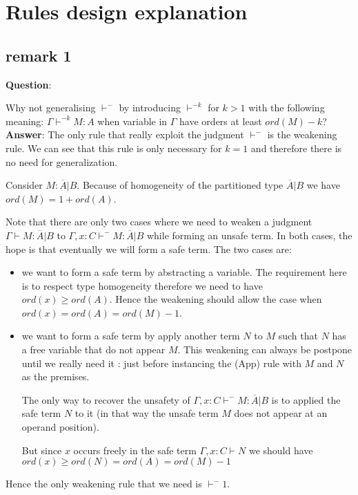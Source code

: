 \documentclass{article}
\begin{document}
\section{Rules design explanation}

\subsection{remark 1}

\textbf{Question}:

Why not generalising $\vdash^-$ by introducing $\vdash^{-k}$ for
$k>1$ with the following meaning: $ \Gamma \vdash^{-k} M : A$ when
variable in $\Gamma$ have orders at least $ord(M)-k$?
\\


\textbf{Answer}: The only rule that really exploit the judgment
$\vdash^-$ is the weakening rule. We can see that this rule is only
necessary for $k=1$ and therefore there is no need for
generalization.



Consider $M : \overline{A} | B$. Because of homogeneity of the
partitioned type $\overline{A} | B$ we have $ord(M) = 1 + ord(A)$.

Note that there are only two cases where we need to weaken a
judgment $\Gamma \vdash M : \overline{A} | B$ to $\Gamma, x: C
\vdash^- M : \overline{A} | B$ while forming an unsafe term. In both
cases, the hope is that eventually we will form a safe term. The two
cases are:

\begin{itemize}
\item
 we want to form a safe term by abstracting a variable. The requirement here is to respect type homogeneity
 therefore we need to have $ord(x) \geq ord(A)$.
Hence the weakening should allow the case when $ord(x) = ord(A) =
ord(M) - 1$.

\item
 we want to form a safe term by apply another term $N$ to $M$ such
that $N$ has a free variable that do not appear $M$. This weakening
can always be postpone until we really need it : just before
instancing the (App) rule with $M$ and $N$ as the premises.

The only way to recover the unsafety of $\Gamma, x: C \vdash^- M :
\overline{A} | B$ is to applied the safe term $N$ to it (in that way
the unsafe term $M$ does not appear at an operand position).

But since $x$ occurs freely in the safe term $\Gamma, x: C \vdash N$
we should have $ord(x) \geq ord(N) = ord(A) = ord(M) -1$
\end{itemize}

Hence the only weakening rule that we need is $\vdash^-1$.
\end{document}
